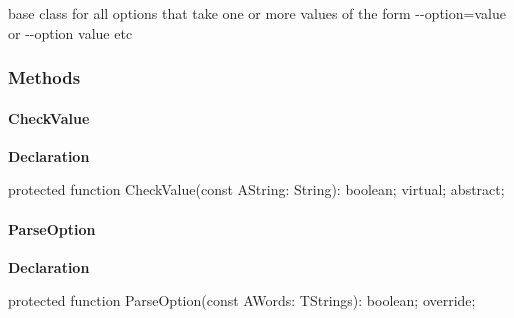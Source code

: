 \documentclass{report}
\newif\ifpdf
\begin{document}
 base class for all options that take one or more values of the form {-}{-}option=value or {-}{-}option value etc\subsubsection*{\large{\textbf{Methods}}\normalsize\hspace{1ex}\hfill}
\paragraph*{CheckValue}\hspace*{\fill}

\label{PasDoc_OptionParser.TValueOption-CheckValue}
\begin{list}{}{
\setlength{\itemindent}{0cm}
\setlength{\listparindent}{0cm}
\setlength{\leftmargin}{\evensidemargin}
\addtolength{\leftmargin}{\tmplength}
\settowidth{\labelsep}{X}
\addtolength{\leftmargin}{\labelsep}
\setlength{\labelwidth}{\tmplength}
}
\item[\textbf{Declaration}\hfill]
\ifpdf
\begin{flushleft}
\fi
\begin{ttfamily}
protected function CheckValue(const AString: String): boolean; virtual; abstract;\end{ttfamily}

\ifpdf
\end{flushleft}
\fi

\end{list}
\paragraph*{ParseOption}\hspace*{\fill}

\label{PasDoc_OptionParser.TValueOption-ParseOption}
\begin{list}{}{
\setlength{\itemindent}{0cm}
\setlength{\listparindent}{0cm}
\setlength{\leftmargin}{\evensidemargin}
\addtolength{\leftmargin}{\tmplength}
\settowidth{\labelsep}{X}
\addtolength{\leftmargin}{\labelsep}
\setlength{\labelwidth}{\tmplength}
}
\item[\textbf{Declaration}\hfill]
\ifpdf
\begin{flushleft}
\fi
\begin{ttfamily}
protected function ParseOption(const AWords: TStrings): boolean; override;\end{ttfamily}

\ifpdf
\end{flushleft}
\fi

\end{list}
\ifpdf
\end{document}
